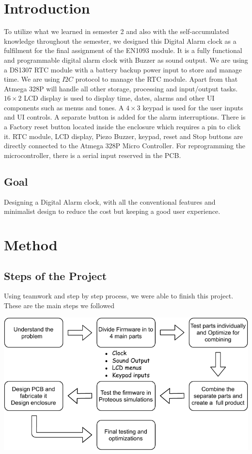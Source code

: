 \chapter{Introduction}

To utilize what we learned in semester 2 and also with the self-accumulated knowledge throughout the semester, we designed this Digital Alarm clock as a fulfilment for the final assignment of the EN1093 module. It is a fully functional and programmable digital alarm clock with Buzzer as sound output.
We are using a DS1307 RTC module with a battery backup power input to store and manage time. We are using $I2C$ protocol to manage the RTC module. Apart from that Atmega 328P will handle all other storage, processing and input/output tasks. $16\times2$ LCD display is used to display time, dates, alarms and other UI components such as menus and tones. A $4\times3$ keypad is used for the user inputs and UI controls. A separate button is added for the alarm interruptions. There is a Factory reset button located inside the enclosure which requires a pin to click it. RTC module, LCD display, Piezo Buzzer, keypad, reset and Stop buttons are directly connected to the Atmega 328P Micro Controller. For reprogramming the microcontroller, there is a serial input reserved in the PCB.


\section{Goal}

Designing a Digital Alarm clock, with all the conventional features and minimalist design to reduce the cost but keeping a good user experience.



\chapter{Method}

\section{Steps of the Project}

Using teamwork and step by step process, we were able to finish this project. These are the main steps we followed

\begin{minipage}{0.97\textwidth}
\centering

\includegraphics[width=\textwidth]{step.pdf}
\end{minipage}

